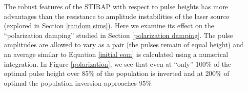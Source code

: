 
The robust features of the STIRAP with respect to pulse heights has more advantages than the resistance to amplitude instabilities of the laser source (explored in Section \ref{random sims}). Here we examine its effect on the ``polarization damping'' studied in Section \ref{polarization damping}. The pulse amplitudes are allowed to vary as a pair (the pulses remain of equal height) and an average similar to Equation \ref{initial eom} is calculated using a numerical integration. In Figure \ref{polarization}, we see that even at ``only'' 100\% of the optimal pulse height over 85\% of the population is inverted and at 200\% of optimal the population inversion approaches 95\%
